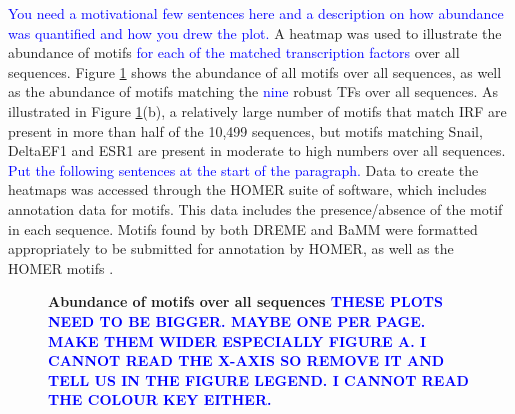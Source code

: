 \documentclass[12pt]{article}
\begin{document}
\textcolor{blue}{You need a motivational few sentences here and a description on how abundance was quantified and how you drew the plot.}
A heatmap was used to illustrate the abundance of motifs \textcolor{blue}{for each of the matched transcription factors} over all sequences. Figure \ref{heatmap} shows the abundance of all motifs over all sequences, as well as the abundance of motifs matching the \textcolor{blue}{nine} robust TFs over all sequences. As illustrated in Figure \ref{heatmap}(b), a relatively large number of motifs that match IRF are present in more than half of the 10,499 sequences, but motifs matching Snail, DeltaEF1 and ESR1 are present in moderate to high numbers over all sequences. \textcolor{blue}{Put the following sentences at the start of the paragraph.} Data to create the heatmaps was accessed through the HOMER suite of software, which includes annotation data for motifs. This data includes the presence/absence of the motif in each sequence. Motifs found by both DREME and BaMM were formatted appropriately to be submitted for annotation by HOMER, as well as the HOMER motifs .


\begin{figure}[!htbp]
\centering
{}
\qquad
{}
\caption{\bf{Abundance of motifs over all sequences} \textcolor{blue}{THESE PLOTS NEED TO BE BIGGER. MAYBE ONE PER PAGE. MAKE THEM WIDER ESPECIALLY FIGURE A. I CANNOT READ THE X-AXIS SO REMOVE IT AND TELL US IN THE FIGURE LEGEND. I CANNOT READ THE COLOUR KEY EITHER.}}
\label{heatmap}
\end{figure}
\end{document}
